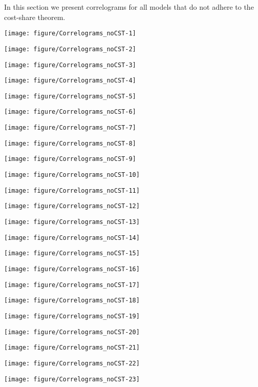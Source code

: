 \documentclass[preprint,authoryear,12pt]{elsarticle}\usepackage[]{graphicx}\usepackage[]{color}
\makeatletter
\def\maxwidth{ %
  \ifdim\Gin@nat@width>\linewidth
    \linewidth
  \else
    \Gin@nat@width
  \fi
}
\newenvironment{knitrout}{}{} %
\makeatother
\begin{document}
In this section we present correlograms for all models that do not adhere to the cost-share theorem.

\begin{knitrout}
\color{fgcolor}
\texttt{[image: figure/Correlograms\_noCST-1]} 

\texttt{[image: figure/Correlograms\_noCST-2]} 

\texttt{[image: figure/Correlograms\_noCST-3]} 

\texttt{[image: figure/Correlograms\_noCST-4]} 

\texttt{[image: figure/Correlograms\_noCST-5]} 

\texttt{[image: figure/Correlograms\_noCST-6]} 

\texttt{[image: figure/Correlograms\_noCST-7]} 

\texttt{[image: figure/Correlograms\_noCST-8]} 

\texttt{[image: figure/Correlograms\_noCST-9]} 

\texttt{[image: figure/Correlograms\_noCST-10]} 

\texttt{[image: figure/Correlograms\_noCST-11]} 

\texttt{[image: figure/Correlograms\_noCST-12]} 

\texttt{[image: figure/Correlograms\_noCST-13]} 

\texttt{[image: figure/Correlograms\_noCST-14]} 

\texttt{[image: figure/Correlograms\_noCST-15]} 

\texttt{[image: figure/Correlograms\_noCST-16]} 

\texttt{[image: figure/Correlograms\_noCST-17]} 

\texttt{[image: figure/Correlograms\_noCST-18]} 

\texttt{[image: figure/Correlograms\_noCST-19]} 

\texttt{[image: figure/Correlograms\_noCST-20]} 

\texttt{[image: figure/Correlograms\_noCST-21]} 

\texttt{[image: figure/Correlograms\_noCST-22]} 

\texttt{[image: figure/Correlograms\_noCST-23]} 


\end{knitrout}
\end{document}

